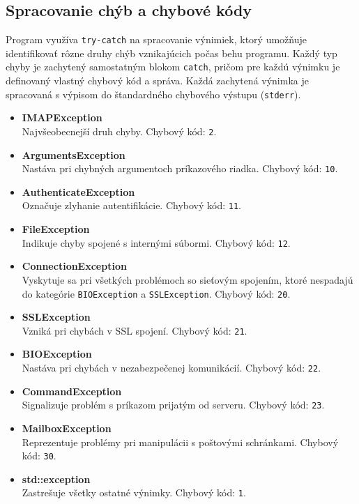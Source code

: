 \documentclass[a4paper, 11pt]{article}
\begin{document}
	\subsection{Spracovanie chýb a chybové kódy}

	Program využíva \texttt{try-catch} na spracovanie výnimiek, ktorý umožňuje identifikovať rôzne druhy chýb vznikajúcich počas behu programu. Každý typ chyby je zachytený samostatným blokom \texttt{catch}, pričom pre každú výnimku je definovaný vlastný chybový kód a správa. Každá zachytená výnimka je spracovaná s výpisom do štandardného chybového výstupu (\texttt{stderr}).
	
	\begin{itemize}
		\item \textbf{IMAPException} \\
		Najvšeobecnejší druh chyby. Chybový kód: \texttt{2}.
		\item \textbf{ArgumentsException} \\
		Nastáva pri chybných argumentoch príkazového riadka. Chybový kód: \texttt{10}.
		\item \textbf{AuthenticateException} \\
		Označuje zlyhanie autentifikácie. Chybový kód: \texttt{11}.
		\item \textbf{FileException} \\
		Indikuje chyby spojené s internými súbormi. Chybový kód: \texttt{12}.
		\item \textbf{ConnectionException} \\
		Vyskytuje sa pri všetkých problémoch so sieťovým spojením, ktoré nespadajú do kategórie \texttt{BIOException} a \texttt{SSLException}. Chybový kód: \texttt{20}.
		\item \textbf{SSLException} \\
		Vzniká pri chybách v SSL spojení. Chybový kód: \texttt{21}.
		\item \textbf{BIOException} \\
		Nastáva pri chybách v nezabezpečenej komunikácií. Chybový kód: \texttt{22}.
		\item \textbf{CommandException} \\
		Signalizuje problém s príkazom prijatým od serveru. Chybový kód: \texttt{23}.
		\item \textbf{MailboxException} \\
		Reprezentuje problémy pri manipulácii s poštovými schránkami. Chybový kód: \texttt{30}.
		\item \textbf{std::exception} \\
		Zastrešuje všetky ostatné výnimky. Chybový kód: \texttt{1}.
	\end{itemize}
	
\end{document}
